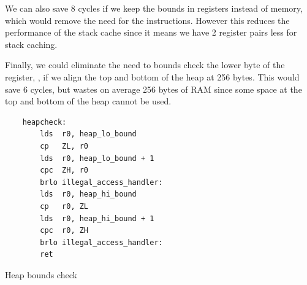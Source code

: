 We can also save 8 cycles if we keep the bounds in registers instead of memory, which would remove the need for the  instructions. However this reduces the performance of the stack cache since it means we have 2 register pairs less for stack caching.

Finally, we could eliminate the need to bounds check the lower byte of the  register, , if we align the top and bottom of the heap at 256 bytes. This would save 6 cycles, but wastes on average 256 bytes of RAM since some space at the top and bottom of the heap cannot be used.

\begin{listing}[H]
	\centering
 	\begin{verbatim}
    heapcheck:
        lds  r0, heap_lo_bound
        cp   ZL, r0
        lds  r0, heap_lo_bound + 1
        cpc  ZH, r0
        brlo illegal_access_handler:
        lds  r0, heap_hi_bound
        cp   r0, ZL
        lds  r0, heap_hi_bound + 1
        cpc  r0, ZH
        brlo illegal_access_handler:
        ret
	\end{verbatim}
	\caption{Heap bounds check}
	\label{lst-heap-bounds-check}
\end{listing}

